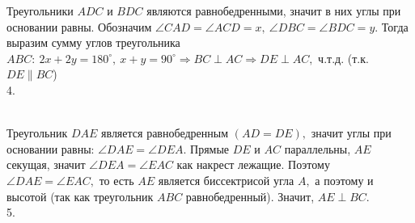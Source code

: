 \documentclass[12pt]{article}
\begin{document}
Треугольники $ADC$ и $BDC$ являются равнобедренными, значит в них углы при основании равны. Обозначим $\angle CAD=\angle ACD=x,\ \angle DBC=\angle BDC=y.$ Тогда выразим сумму углов треугольника $ABC:\ 2x+2y=180^\circ,\ x+y=90^\circ\Rightarrow BC \perp AC\Rightarrow DE\perp AC,$ ч.т.д. (т.к. $DE\parallel BC$)\\
4. \begin{figure}[ht!]
\end{figure}\\
Треугольник $DAE$ является равнобедренным $(AD=DE),$ значит углы при основании равны: $\angle DAE=\angle DEA.$ Прямые $DE$ и $AC$ параллельны, $AE$ секущая, значит  $\angle DEA=\angle EAC$ как накрест лежащие. Поэтому $\angle DAE=\angle EAC,$ то есть $AE$ является биссектрисой угла $A,$ а поэтому и высотой (так как треугольник $ABC$ равнобедренный). Значит, $AE\perp BC.$\\
5. \begin{figure}[ht!]
\end{figure}\\
\end{document}

